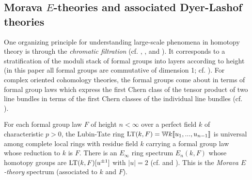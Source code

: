 \documentclass{gtpart}
\theoremstyle{definition}
\theoremstyle{remark}
\newcommand{\mb}[1]{\mathbb{#1}}
\newcommand{\LT}{{\rm LT}}
\begin{document}
\subsection{Morava $E$-theories and associated Dyer-Lashof theories}

One organizing principle for understanding large-scale phenomena in homotopy 
theory is through the {\em chromatic filtration} (cf. \cite{tafoverview}, 
\cite[section 17]{coctalos}, \cite[section 2.5]{orange} and \cite{green}).  It 
corresponds to a stratification of the moduli stack of formal groups into 
layers according to height (in this paper all formal groups are commutative of 
dimension 1; cf. \cite[III.\S1]{fg}).  For complex oriented cohomology 
theories, the formal groups come about in terms of formal group laws which 
express the first Chern class of the tensor product of two line bundles in 
terms of the first Chern classes of the individual line bundles 
(cf. \cite[section 1]{coctalos}).  

For each formal group law $F$ of height $n<\infty$ over a perfect field $k$ of 
characteristic $p>0$, the Lubin-Tate ring 
$\LT(k,F) = {\mb W}k \llbracket u_1,...,u_{n-1} \rrbracket$ is universal among 
complete local rings with residue field $k$ carrying a formal group law whose 
reduction to $k$ is $F$.  There is an $E_\infty$ ring spectrum $E_n(k,F)$ 
whose homotopy groups are $\LT(k,F)[u^{\pm1}]$ with $|u| = 2$ (cf. 
\cite[theorem 8]{tafoverview} and \cite{H-Mthm}).  This is the {\em Morava 
$E$-theory} spectrum (associated to $k$ and $F$).  
\end{document}

